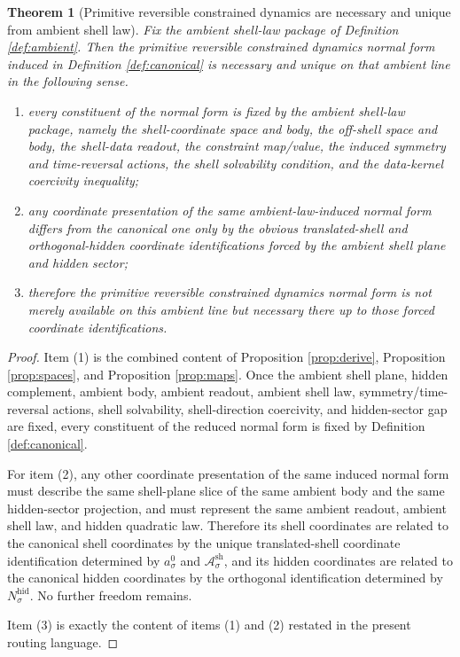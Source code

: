 \documentclass[11pt]{article}
\newcommand{\ShellAffine}[1]{\mathcal A_{#1}^{\mathrm{sh}}}
\newcommand{\HiddenSpace}[1]{N_{#1}^{\mathrm{hid}}}
\newcommand{\AmbientRef}[1]{a_{#1}^{0}}
\newtheorem{theorem}{Theorem}
\begin{document}
\begin{theorem}[Primitive reversible constrained dynamics are necessary and unique from ambient shell law]
\label{thm:necessity}
Fix the ambient shell-law package of Definition \ref{def:ambient}. Then the primitive reversible constrained dynamics normal form induced in Definition \ref{def:canonical} is necessary and unique on that ambient line in the following sense.
\begin{enumerate}
    \item every constituent of the normal form is fixed by the ambient shell-law package, namely the shell-coordinate space and body, the off-shell space and body, the shell-data readout, the constraint map/value, the induced symmetry and time-reversal actions, the shell solvability condition, and the data-kernel coercivity inequality;
    \item any coordinate presentation of the same ambient-law-induced normal form differs from the canonical one only by the obvious translated-shell and orthogonal-hidden coordinate identifications forced by the ambient shell plane and hidden sector;
    \item therefore the primitive reversible constrained dynamics normal form is not merely available on this ambient line but necessary there up to those forced coordinate identifications.
\end{enumerate}
\end{theorem}

\begin{proof}
Item (1) is the combined content of Proposition \ref{prop:derive}, Proposition \ref{prop:spaces}, and Proposition \ref{prop:maps}. Once the ambient shell plane, hidden complement, ambient body, ambient readout, ambient shell law, symmetry/time-reversal actions, shell solvability, shell-direction coercivity, and hidden-sector gap are fixed, every constituent of the reduced normal form is fixed by Definition \ref{def:canonical}.

For item (2), any other coordinate presentation of the same induced normal form must describe the same shell-plane slice of the same ambient body and the same hidden-sector projection, and must represent the same ambient readout, ambient shell law, and hidden quadratic law. Therefore its shell coordinates are related to the canonical shell coordinates by the unique translated-shell coordinate identification determined by \(\AmbientRef{\sigma}\) and \(\ShellAffine{\sigma}\), and its hidden coordinates are related to the canonical hidden coordinates by the orthogonal identification determined by \(\HiddenSpace{\sigma}\). No further freedom remains.

Item (3) is exactly the content of items (1) and (2) restated in the present routing language.
\end{proof}
\end{document}
